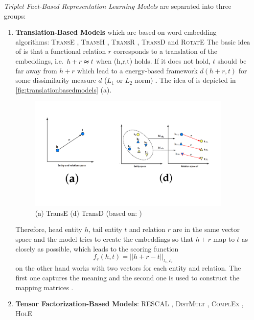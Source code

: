 \textit{Triplet Fact-Based Representation Learning Models} are separated into three groups:
\begin{enumerate}
    \item 
    \textbf{Translation-Based Models}  which are based on word embedding algorithms: 
    \textsc{TransE} \cite{TransE}, \textsc{TransH} \cite{TransH}, \textsc{TransR} \cite{TransR}, \textsc{TransD} \cite{TransD}
    and 
    \textsc{RotatE} \cite{RotatE}
    The basic idea of \transe is that a functional relation $r$ corresponds to a translation of the embeddings, i.e. $h + r \thickapprox t$ when (h,r,t) holds.
    If it does not hold, $t$ should be far away from $h + r$ which lead to a energy-based framework $d(h+r, t)$ for some dissimilarity measure $d$ ($L_1$ or $L_2$ norm) \cite{TransE}.
    The idea of \transe is depicted in \autoref{fig:translationbasedmodels} (a).
    \begin{figure}[t]
      \centering
        \includegraphics[width=0.95\textwidth]{figures/TransE+TransD.png}
      \caption{(a) TransE (d) TransD (based on: \cite{cai2017kbgan})}
      \label{fig:translationbasedmodels}
    \end{figure}
    Therefore, head entity $h$, tail entity $t$ and relation $r$ are in the same vector space and the model tries to create the embeddings so that $h+r$ map to $t$ as closely as possible, which leads to the scoring function
    \begin{equation}
        f_r(h,t) = || h + r - t ||_{l_1, l_2}
        \label{eq:transescoringfunction}
    \end{equation}
    \transd on the other hand works with two vectors for each entity and relation.
    The first one captures the meaning and the second one is used to construct the mapping matrices \cite{TransD}.

    \item 
    \textbf{Tensor Factorization-Based Models}:
    \textsc{RESCAL} \cite{RESCAL}, \textsc{DistMult} \cite{DistMult}, \textsc{ComplEx} \cite{ComplEx}, \textsc{HolE} \cite{HolE}


\end{enumerate}
